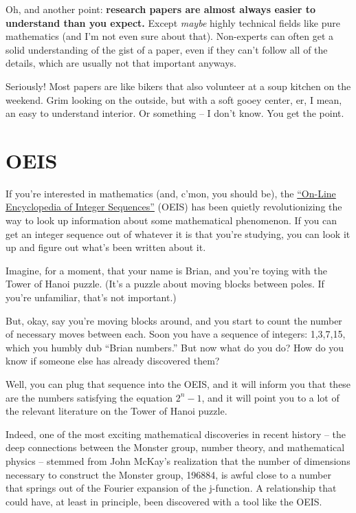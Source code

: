 Oh, and another point: \textbf{research papers are almost always easier to
  understand than you expect.} Except \textit{maybe} highly technical fields like
pure mathematics (and I'm not even sure about that). Non-experts can often get a
solid understanding of the gist of a paper, even if they can't follow all of the
details, which are usually not that important anyways.

Seriously! Most papers are like bikers that also volunteer at a soup kitchen on
the weekend. Grim looking on the outside, but with a soft gooey center, er, I
mean, an easy to understand interior. Or something -- I don't know. You get the point.

\section{OEIS}

If you're interested in mathematics (and, c'mon, you should be), the \href{https://oeis.org/}{``On-Line Encyclopedia of Integer
Sequences''} (OEIS) has been quietly revolutionizing the way to look up information
about some mathematical phenomenon. If you can get an integer sequence out of whatever it is that you're studying,
you can look it up and figure out what's been written about it.

Imagine, for a moment, that your name is Brian, and you're toying with the Tower
of Hanoi puzzle. (It's a puzzle about moving blocks between poles. If you're
unfamiliar, that's not important.)


But, okay, say you're moving blocks around, and you start to count the number of
necessary moves between each. Soon you have a sequence of integers:
1,3,7,15, which you humbly dub ``Brian numbers.'' But now what do you do? How do you know if someone else has already discovered them?

Well, you can plug that sequence into the OEIS, and it will inform you that
these are the numbers satisfying the equation \(2^{n} - 1\), and it will point you to
a lot of the relevant literature on the Tower of Hanoi puzzle.

Indeed, one of the most exciting mathematical discoveries in recent history -- the deep connections between the Monster group, number theory, and mathematical physics -- stemmed from John McKay's realization that the number of dimensions necessary to construct the Monster group, 196884, is awful close to a number that springs out of the Fourier expansion of the j-function. A relationship that could have, at least in principle, been discovered with a tool like the OEIS. 

